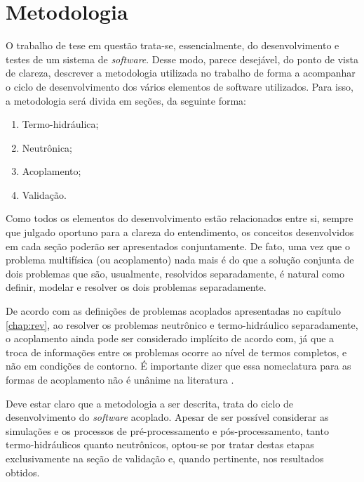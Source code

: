 \chapter{Metodologia}
\label{chap:metodologia}

O trabalho de tese em questão trata-se, essencialmente, do desenvolvimento e testes
de um sistema de \textit{software}. Desse modo, parece desejável, do ponto de vista de
clareza, descrever a metodologia utilizada no trabalho de forma a acompanhar o ciclo
de desenvolvimento dos vários elementos de software utilizados. Para isso, a metodologia
será divida em seções, da seguinte forma:
\begin{enumerate}
\item Termo-hidráulica;
\item Neutrônica;
\item Acoplamento;
  \item Validação.
  \end{enumerate}

Como todos os elementos do desenvolvimento estão relacionados entre si, sempre que
julgado oportuno para a clareza do entendimento, os conceitos desenvolvidos em cada
seção poderão ser apresentados conjuntamente. De fato, uma vez que o problema multifísica
(ou acoplamento) nada mais é do que a solução conjunta de dois problemas que são,
usualmente, resolvidos separadamente, é natural como definir, modelar e resolver os
dois problemas separadamente.

De acordo com as definições de problemas acoplados apresentadas
no capítulo \ref{chap:rev}, ao resolver os problemas neutrônico e termo-hidráulico
separadamente, o acoplamento ainda pode ser considerado implícito de acordo com, já que a troca de informações entre os problemas ocorre ao nível de termos completos,
e não em condições de contorno. É importante dizer que essa nomeclatura para as formas
de acoplamento não é unânime na literatura \cite{Ivanov2007}.

Deve estar claro que a metodologia a ser descrita, trata do ciclo de desenvolvimento
do \textit{software} acoplado. Apesar de ser possível considerar as simulações e
os processos de pré-processamento e pós-processamento, tanto termo-hidráulicos quanto
neutrônicos, optou-se por tratar destas etapas exclusivamente na seção de validação e,
quando pertinente, nos resultados obtidos.

